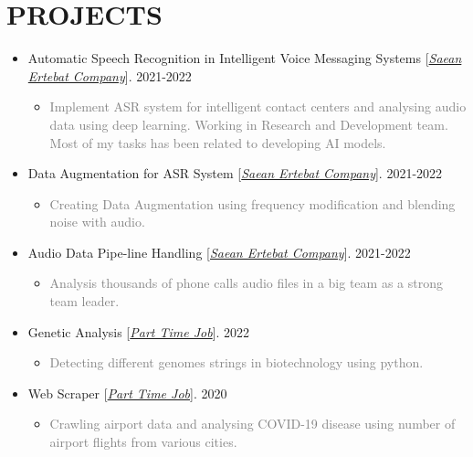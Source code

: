 \documentclass[10pt,a4paper,sans]{moderncv} %
\begin{document}
	\section{PROJECTS}
	\vspace{0.3em}
	\begin{itemize}
		
		\item Automatic Speech Recognition in Intelligent Voice Messaging Systems  [\href{http://www.senatelecom.com/}{\emph{Saean Ertebat Company}}]. \hfill 2021-2022
		\begin{itemize}
			\item \textcolor{gray} {Implement ASR system for intelligent contact centers and analysing audio data using deep learning. Working in Research and Development team. Most of my tasks has been related to developing AI models.}
		\end{itemize}

		\item Data Augmentation for ASR System [\href{http://www.senatelecom.com/}{\emph{Saean Ertebat Company}}]. \hfill 2021-2022
		\begin{itemize}
			\item \textcolor{gray} {Creating Data Augmentation using frequency modification and blending noise with audio.}
		\end{itemize}

		\item Audio Data Pipe-line Handling [\href{http://www.senatelecom.com/}{\emph{Saean Ertebat Company}}]. \hfill 2021-2022
		\begin{itemize}
			\item \textcolor{gray} {Analysis thousands of phone calls audio files in a big team as a strong team leader.}
		\end{itemize}
		
		\item Genetic Analysis [\href{mailto:mbahmanabadi96@gmail.com}{\emph{Part Time Job}}]. \hfill 2022
		\begin{itemize}
			\item \textcolor{gray} {Detecting different genomes strings in biotechnology using python.}
		\end{itemize}

		\item Web Scraper [\href{mailto:mbahmanabadi96@gmail.com}{\emph{Part Time Job}}]. \hfill 2020
		\begin{itemize}
			\item \textcolor{gray} {Crawling airport data and analysing COVID-19 disease using number of airport flights from various cities.}
		\end{itemize}


\end{itemize}
\end{document}
